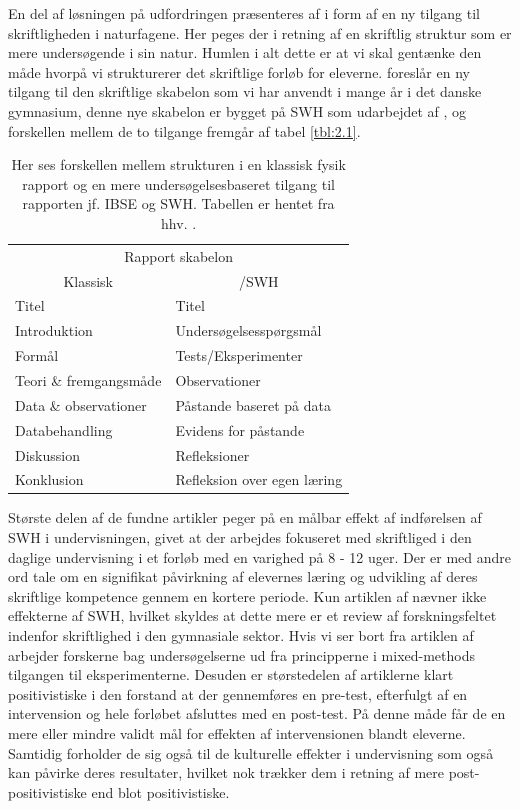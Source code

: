 En del af løsningen på udfordringen præsenteres af \citep{Keys1999, Burke2005} i form af en ny tilgang til skriftligheden i naturfagene. Her peges der i retning af en skriftlig struktur som er mere undersøgende i sin natur. Humlen i alt dette er at vi skal gentænke den måde hvorpå vi strukturerer det skriftlige forløb for eleverne. \citet{Burke2005} foreslår en ny tilgang til den skriftlige skabelon som vi har anvendt i mange år i det danske gymnasium, denne nye skabelon er bygget på SWH som udarbejdet af \citep{Keys1999}, og forskellen mellem de to tilgange fremgår af tabel \vref{tbl:2.1}.

\begin{table}
	\centering
	\caption[Rapport skabeloner]{Her ses forskellen mellem strukturen i en klassisk fysik rapport og en mere undersøgelsesbaseret tilgang til rapporten jf. IBSE og SWH. Tabellen er hentet fra hhv. 
	\citet{Burke2005, Keys1999}.}
	\label{tbl:2.1}
	\begin{tabular}{@{ } l l @{ }}
		\toprule[2.5pt]
			\multicolumn{2}{c}{Rapport skabelon}\\
			\multicolumn{1}{c}{Klassisk} & \multicolumn{1}{c}{\ib{}/SWH}\\
		\midrule[1.25pt]
			Titel				&	Titel\\
			Introduktion			&	Undersøgelsesspørgsmål\\
			Formål			& 	Tests/Eksperimenter\\
			Teori \& fremgangsmåde		&	Observationer\\
			Data \& observationer	&	Påstande baseret på data\\
			Databehandling		&	Evidens for påstande\\
			Diskussion			&	Refleksioner\\
			Konklusion			&	Refleksion over egen læring\\
		\bottomrule[2.5pt]
	\end{tabular}
\end{table}

Største delen af de fundne artikler peger på en målbar effekt af indførelsen af SWH i undervisningen, givet at der arbejdes fokuseret med skriftliged i den daglige undervisning i et forløb med en varighed på 8 - 12 uger. Der er med andre ord tale om en signifikat påvirkning af elevernes læring og udvikling af deres skriftlige kompetence gennem en kortere periode. Kun artiklen af \citep{Miller2018} nævner ikke effekterne af SWH, hvilket skyldes at dette mere er et review af forskningsfeltet indenfor skriftlighed i den gymnasiale sektor. Hvis vi ser bort fra artiklen af \citep{Miller2018, Dolin2014, Krogh2016} arbejder forskerne bag undersøgelserne ud fra principperne i mixed-methods tilgangen til eksperimenterne. Desuden er størstedelen af artiklerne klart positivistiske i den forstand at der gennemføres en pre-test, efterfulgt af en intervension og hele forløbet afsluttes med en post-test. På denne måde får de en mere eller mindre validt mål for effekten af intervensionen blandt eleverne. Samtidig forholder de sig også til de kulturelle effekter i undervisning som også kan påvirke deres resultater, hvilket nok trækker dem i retning af mere post-positivistiske end blot positivistiske.


